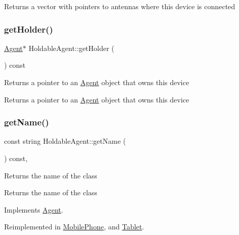 \begin{DoxyReturn}{Returns}
a vector with pointers to antennas where this device is connected 
\end{DoxyReturn}
\mbox{\label{class_holdable_agent_a51f29e5aecf9d288935ddae6da4096ed}} 
\subsubsection{\texorpdfstring{getHolder()}{getHolder()}}
{\footnotesize\ttfamily \mbox{\hyperlink{class_agent}{Agent}}$\ast$ Holdable\+Agent\+::get\+Holder (\begin{DoxyParamCaption}{ }\end{DoxyParamCaption}) const}

Returns a pointer to an \mbox{\hyperlink{class_agent}{Agent}} object that owns this device \begin{DoxyReturn}{Returns}
a pointer to an \mbox{\hyperlink{class_agent}{Agent}} object that owns this device 
\end{DoxyReturn}
\mbox{\label{class_holdable_agent_ab330bb40de51a957ef8826af629f94a2}} 
\subsubsection{\texorpdfstring{getName()}{getName()}}
{\footnotesize\ttfamily const string Holdable\+Agent\+::get\+Name (\begin{DoxyParamCaption}{ }\end{DoxyParamCaption}) const\hspace{0.3cm}{\ttfamily [override]}, {\ttfamily [virtual]}}

Returns the name of the class \begin{DoxyReturn}{Returns}
the name of the class 
\end{DoxyReturn}


Implements \mbox{\hyperlink{class_agent_afe6c72d91baf9ee4fe77ea1ed7fef3ba}{Agent}}.



Reimplemented in \mbox{\hyperlink{class_mobile_phone_a1eeac3141baafa75ebcf26fc3a0e4068}{Mobile\+Phone}}, and \mbox{\hyperlink{class_tablet_adc7196aaee1e9714236b7cd8825d5826}{Tablet}}.

